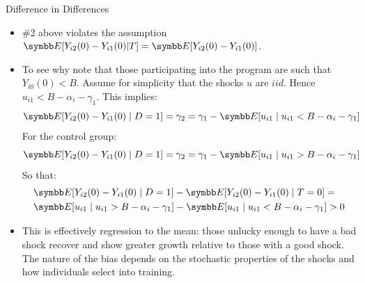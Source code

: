 \documentclass[aspectratio=169,11pt]{beamer}
\begin{document}
\begin{frame}{Difference in Differences}
\small
\begin{itemize}
\item  \#2 above violates the assumption {\small $\E[Y_{i2}(0) - Y_{i1}(0) | T] = \E[Y_{i2}(0) - Y_{i1}(0)]$}. 
\item To see why note that those participating into the program are such
that {\small $Y_{i0}(0) < B$}. Assume for simplicity that the shocks {\small $u$} are {\small $iid$}. Hence {\small $u_{i1} < B- \alpha_i - \gamma_1$}. 
This implies: 
{\small $$\E[Y_{i2}(0)- Y_{i1}(0) \mid D=1] = \gamma_2 = \gamma_1 - \E[u_{i1} \mid u_{i1} <  B-\alpha_i - \gamma_1]$$}
For the control group:
{\small $$\E[Y_{i2}(0) - Y_{i1}(0) \mid D=1] = \gamma_2 = \gamma_1 - \E[u_{i1} \mid u_{i1} >  B-\alpha_i - \gamma_1]$$}
So that:
\begin{align*}
& \E[Y_{i2}(0) - Y_{i1}(0) \mid D=1] - \E[Y_{i2}(0) - Y_{i1}(0) \mid T=0] =\\
&  \E[u_{i1} \mid u_{i1} >  B-\alpha_i - \gamma_1] - \E[u_{i1} \mid u_{i1} < B-\alpha_i - \gamma_1]  >0
  \end{align*}
 \item This is effectively regression to the mean: those unlucky enough to have a bad shock recover and show greater growth relative to those with a good shock. The nature of the bias depends on the stochastic properties of the shocks and how individuals select into training.
\end{itemize}
\end{frame} 


\end{document}
